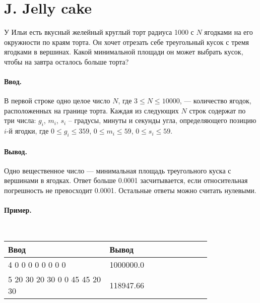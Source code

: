 \documentclass[10pt, a5paper]{article}
\newcommand{\informat}[1]
{
	\paragraph{Ввод.\\} #1
}
\newcommand{\outformat}[1]
{
	\paragraph{Вывод.\\} #1
}
\newcommand{\examplee}[4]
{
	\paragraph{Пример.\\}
	{\tt
	\begin{tabular}{|p{0.4\linewidth}|p{0.4\linewidth}|}
	\hline
	Ввод 	& Вывод  	\\
	\hline
	#1 		& #2 		\\
	\hline
	#3		& #4		\\
	\hline
	\end{tabular}
	}
}
\begin{document}
\section*{J. Jelly cake}

У Ильи есть вкусный желейный круглый торт радиуса 1000 с $N$ ягодками на его окружности по краям торта. Он хочет отрезать себе треугольный кусок с тремя ягодками в вершинах. Какой минимальной площади он может выбрать кусок, чтобы на завтра осталось больше торта?

\informat{В первой строке одно целое число $N$, где $3 \le N \le 10000$, --- количество ягодок, расположенных на границе торта. \newline Каждая из следующих $N$ строк содержат по три числа: $g_i$, $m_i$, $s_i$ -- градусы, минуты и секунды угла, определяющего позицию $i$-й ягодки, где $0 \le g_i \le 359$, $0 \le m_i \le 59$, $0 \le s_i \le 59$.}

\outformat{Одно вещественное число --- минимальная площадь треугольного куска с вершинами в ягодках. Ответ больше 0.0001 засчитывается, если относительная погрешность не превосходит 0.0001. Остальные ответы можно считать нулевыми.}

\examplee{4 \newline
0 0 0\newline
90 0 0\newline
180 0 0\newline
270 0 0}{1000000.0}
{5 \newline
180 20 30\newline
120 20 30\newline
0 0 0\newline
45 45 45\newline
90 20 30}{118947.66}
\end{document}
